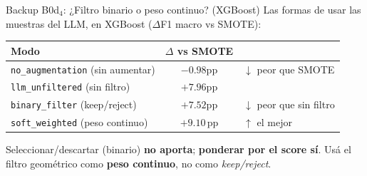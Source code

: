 \begin{frame}{Backup B0d$_4$: ¿Filtro binario o peso continuo? (XGBoost)}
\centering
\vspace{0.6em}
{\small Las formas de usar las muestras del LLM, en XGBoost ($\Delta$F1 macro vs SMOTE):}

\vspace{1.1em}
\setlength{\tabcolsep}{10pt}
\renewcommand{\arraystretch}{1.5}
\begin{tabular}{@{}lcl@{}}
\toprule
\textbf{Modo}                            & \textbf{$\Delta$ vs SMOTE}        & \\
\midrule
\texttt{no\_augmentation} (sin aumentar) & $-0.98$pp                         & \textcolor{red!70!black}{$\downarrow$ peor que SMOTE} \\
\texttt{llm\_unfiltered} (sin filtro)    & $+7.96$pp                         & \\
\rowcolor{gray!15}
\texttt{binary\_filter} (keep/reject)    & $+7.52$pp                         & \textcolor{red!70!black}{$\downarrow$ peor que sin filtro} \\
\rowcolor{uaigreen!15}
\texttt{soft\_weighted} (peso continuo)  & \alert{$\boldsymbol{+9.10}$\,pp}  & \textcolor{uaigreen!55!black}{$\uparrow$ el mejor} \\
\bottomrule
\end{tabular}

\vspace{1.3em}
\begin{insight}
\small Seleccionar/descartar (binario) \textbf{no aporta}; \textbf{ponderar por el score sí}. Usá el filtro geométrico como \textbf{peso continuo}, no como \emph{keep/reject}.
\end{insight}
\end{frame}

